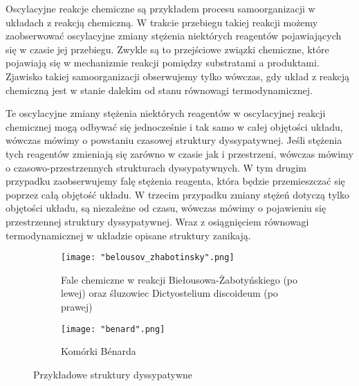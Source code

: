 \documentclass[10pt, a4paper, twoside, onecolumn]{article}
\numberwithin{equation}{section}
\begin{document}
	Oscylacyjne reakcje chemiczne są przykładem procesu samoorganizacji w układach z reakcją chemiczną. W trakcie przebiegu takiej reakcji możemy zaobserwować oscylacyjne zmiany stężenia niektórych reagentów pojawiających się w czasie jej przebiegu. Zwykle są to przejściowe związki chemiczne, które pojawiają się w mechanizmie reakcji pomiędzy substratami a produktami. Zjawisko takiej samoorganizacji obserwujemy tylko wówczas, gdy układ z reakcją chemiczną jest w stanie dalekim od stanu równowagi termodynamicznej. \par
	Te oscylacyjne zmiany stężenia niektórych reagentów w oscylacyjnej reakcji chemicznej mogą odbywać się jednocześnie i tak samo w całej objętości układu, wówczas mówimy o powstaniu czasowej struktury dyssypatywnej. Jeśli stężenia tych reagentów zmieniają się zarówno w czasie jak i przestrzeni, wówczas mówimy o czasowo-przestrzennych strukturach dyssypatywnych. W tym drugim przypadku zaobserwujemy falę stężenia reagenta, która będzie przemieszczać się poprzez całą objętość układu. W trzecim przypadku zmiany stężeń dotyczą tylko objętości układu, są niezależne od czasu, wówczas mówimy o pojawieniu się przestrzennej struktury dyssypatywnej. Wraz z osiągnięciem równowagi termodynamicznej w układzie opisane struktury zanikają. 
	
	\begin{figure}[H]
		\centering
		\begin{subfigure}{0.45\textwidth}
			\centering
			\texttt{[image: "belousov\_zhabotinsky".png]}
			\caption{Fale chemiczne w reakcji Biełousowa-Żabotyńskiego (po lewej) oraz śluzowiec Dictyostelium discoideum (po prawej) \cite{epstein}}
			\label{fig:bz_disco}
		\end{subfigure}
		\begin{subfigure}{0.45\textwidth}
			\centering
			\texttt{[image: "benard".png]}
			\caption{Komórki B\'{e}narda \cite{prigogine}}
			\label{fig:benard}
		\end{subfigure}
		\caption{Przykładowe struktury dyssypatywne}
		\label{fig:struktury_dyssypatywne}
	\end{figure}
	
\end{document}
